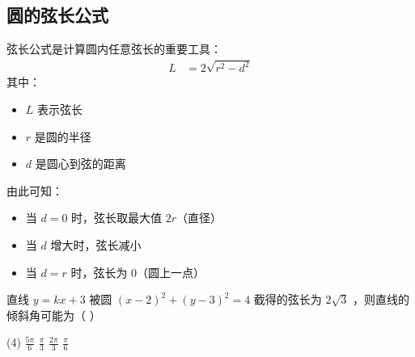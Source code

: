 \subsection{圆的弦长公式}
\begin{theorem}[弦长公式的应用]
    \begin{minipage}{0.45\textwidth}
        弦长公式是计算圆内任意弦长的重要工具：
        \begin{align*}
            L & = 2\sqrt{r^2-d^2}
        \end{align*}
        其中：
        \begin{itemize}
            \item $L$ 表示弦长
            \item $r$ 是圆的半径
            \item $d$ 是圆心到弦的距离
        \end{itemize}

        由此可知：
        \begin{itemize}
            \item 当 $d=0$ 时，弦长取最大值 $2r$（直径）
            \item 当 $d$ 增大时，弦长减小
            \item 当 $d=r$ 时，弦长为 $0$（圆上一点）
        \end{itemize}
    \end{minipage}
    \begin{minipage}{0.5\textwidth}
    \end{minipage}
\end{theorem}
\begin{example}
    直线 $y=k x+3$ 被圆 $(x-2)^2+(y-3)^2=4$ 截得的弦长为 $2 \sqrt{3}$ ，则直线的倾斜角可能为（ \hspace{2em} ）
    \begin{tasks}(4)
        \task $\frac{5 \pi}{6}$
        \task $\frac{\pi}{3}$
        \task $\frac{2 \pi}{3}$
        \task $\frac{\pi}{6}$
    \end{tasks}
\end{example}

